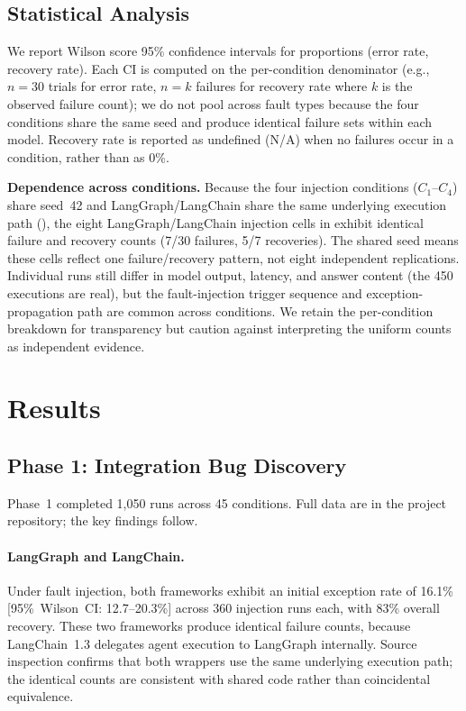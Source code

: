 \documentclass[make,article,submit,moreauthors,pdftex]{mdpi}
\begin{document}
\subsection{Statistical Analysis}

We report Wilson score 95\% confidence intervals for proportions (error rate, recovery rate). Each CI is computed on the per-condition denominator (e.g., $n = 30$ trials for error rate, $n = k$ failures for recovery rate where $k$ is the observed failure count); we do not pool across fault types because the four conditions share the same seed and produce identical failure sets within each model. Recovery rate is reported as undefined (N/A) when no failures occur in a condition, rather than as 0\%.

{\textbf{Dependence across conditions.} Because the four injection conditions ($C_1$--$C_4$) share seed~42 and LangGraph/LangChain share the same underlying execution path (), the eight LangGraph/LangChain injection cells in  exhibit identical failure and recovery counts (7/30 failures, 5/7 recoveries). The shared seed means these cells reflect one failure/recovery pattern, not eight independent replications. Individual runs still differ in model output, latency, and answer content (the 450 executions are real), but the fault-injection trigger sequence and exception-propagation path are common across conditions. We retain the per-condition breakdown for transparency but caution against interpreting the uniform counts as independent evidence.}


\section{Results}\label{sec:results}

\subsection{Phase 1: Integration Bug Discovery}\label{sec:phase1-results}

Phase~1 completed 1{,}050 runs across 45 conditions. Full data are in the project repository; the key findings follow.

\paragraph{LangGraph and LangChain.} Under fault injection, both frameworks exhibit an initial exception rate of 16.1\% [95\%~Wilson~CI: 12.7--20.3\%] across 360 injection runs each, with 83\% overall recovery. These two frameworks produce identical failure counts, because LangChain~1.3 delegates agent execution to LangGraph internally. Source inspection confirms that both wrappers use the same underlying execution path; the identical counts are consistent with shared code rather than coincidental equivalence.
\end{document}
